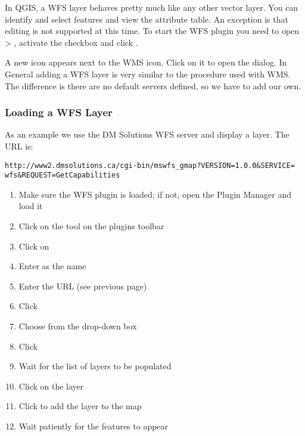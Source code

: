 In QGIS, a WFS layer behaves pretty much like any other vector layer. You 
can identify and select features and view the attribute table. An exception 
is that editing is not supported at this time. To start the WFS plugin you 
need to open  > , 
activate the  checkbox and click . 

A new  icon appears next 
to the WMS icon. Click on it to open the dialog. In General adding a WFS 
layer is very similar to the procedure used with WMS. The difference is 
there are no default servers defined, so we have to add our own.

\subsubsection{Loading a WFS Layer}

As an example we use the DM Solutions WFS server and display a layer. The URL is:
\begin{verbatim}
http://www2.dmsolutions.ca/cgi-bin/mswfs_gmap?VERSION=1.0.0&SERVICE=
wfs&REQUEST=GetCapabilities
\end{verbatim}

\begin{enumerate}
  \item Make sure the WFS plugin is loaded; if not, open the Plugin Manager and load it
  \item Click on the 
  tool on the plugins toolbar
  \item Click on  
  \item Enter  as the name
  \item Enter the URL (see previous page)
  \item Click  
  \item Choose  from the drop-down box
  \item Click  
  \item Wait for the list of layers to be populated
  \item Click on the  layer
  \item Click  to add the layer to the map
  \item Wait patiently for the features to appear
\end{enumerate}

